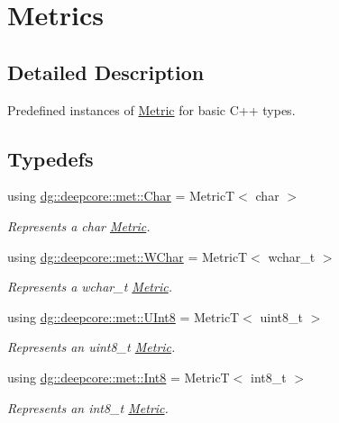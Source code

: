 \hypertarget{group___process_metrics}{}\section{Metrics}
\label{group___process_metrics}


\subsection{Detailed Description}
Predefined instances of \hyperlink{classdg_1_1deepcore_1_1_metric}{Metric} for basic C++ types. 

\subsection*{Typedefs}
\begin{DoxyCompactItemize}
\item 
using \hyperlink{group___process_metrics_ga3689c12dcf2ea830e912ac1dc4c504ce}{dg\+::deepcore\+::met\+::\+Char} = MetricT$<$ char $>$
\begin{DoxyCompactList}\small\item\em Represents a {\ttfamily char} \hyperlink{classdg_1_1deepcore_1_1_metric}{Metric}. \end{DoxyCompactList}\item 
using \hyperlink{group___process_metrics_ga1b9b88b573ba6176c03d75acb590e962}{dg\+::deepcore\+::met\+::\+W\+Char} = MetricT$<$ wchar\+\_\+t $>$
\begin{DoxyCompactList}\small\item\em Represents a {\ttfamily wchar\+\_\+t} \hyperlink{classdg_1_1deepcore_1_1_metric}{Metric}. \end{DoxyCompactList}\item 
using \hyperlink{group___process_metrics_ga17ad9985c2ab7f5e45d50cdcac20b857}{dg\+::deepcore\+::met\+::\+U\+Int8} = MetricT$<$ uint8\+\_\+t $>$
\begin{DoxyCompactList}\small\item\em Represents an {\ttfamily uint8\+\_\+t} \hyperlink{classdg_1_1deepcore_1_1_metric}{Metric}. \end{DoxyCompactList}\item 
using \hyperlink{group___process_metrics_gaa1a7c0e8050673a6327d8856f334ec10}{dg\+::deepcore\+::met\+::\+Int8} = MetricT$<$ int8\+\_\+t $>$
\begin{DoxyCompactList}\small\item\em Represents an {\ttfamily int8\+\_\+t} \hyperlink{classdg_1_1deepcore_1_1_metric}{Metric}. \end{DoxyCompactList}\item 

\end{DoxyCompactItemize}
